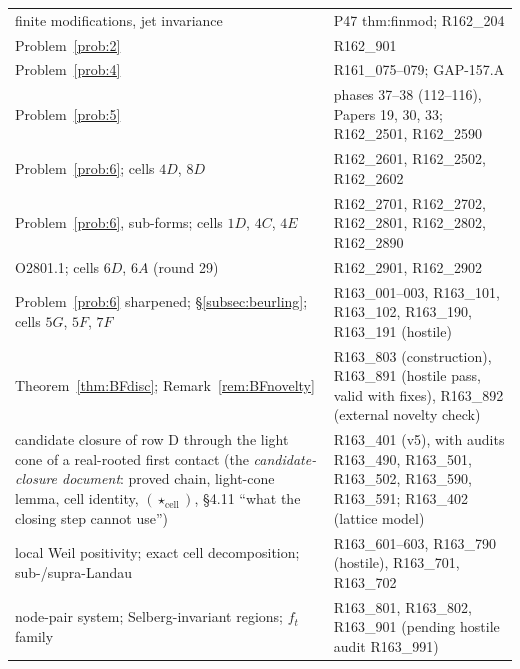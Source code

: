 \documentclass[11pt]{amsart}
\theoremstyle{definition}
\theoremstyle{remark}
\begin{document}
\begin{center}
\begin{tabularx}{\textwidth}{@{}p{5.2cm}Y@{}}
finite modifications, jet invariance & P47 thm:finmod; R162\_204 \\
Problem~\ref{prob:2} & R162\_901 \\
Problem~\ref{prob:4} & R161\_075--079; GAP-157.A \\
Problem~\ref{prob:5} & phases 37--38 (112--116), Papers 19, 30, 33; R162\_2501, R162\_2590 \\
Problem~\ref{prob:6}; cells $4D$, $8D$ & R162\_2601, R162\_2502, R162\_2602 \\
Problem~\ref{prob:6}, sub-forms; cells $1D$, $4C$, $4E$ & R162\_2701, R162\_2702, R162\_2801, R162\_2802, R162\_2890 \\
O2801.1; cells $6D$, $6A$ (round 29) & R162\_2901, R162\_2902 \\
Problem~\ref{prob:6} sharpened; \S\ref{subsec:beurling}; cells $5G$, $5F$, $7F$ & R163\_001--003, R163\_101, R163\_102, R163\_190, R163\_191 (hostile) \\
Theorem~\ref{thm:BFdisc}; Remark~\ref{rem:BFnovelty} & R163\_803 (construction), R163\_891 (hostile pass, valid with fixes), R163\_892 (external novelty check) \\
candidate closure of row D through the light cone of a real-rooted first contact (the \emph{candidate-closure document}: proved chain, light-cone lemma, cell identity, $(\star_{\mathrm{cell}})$, \S4.11 ``what the closing step cannot use'') & R163\_401 (v5), with audits R163\_490, R163\_501, R163\_502, R163\_590, R163\_591; R163\_402 (lattice model) \\
local Weil positivity; exact cell decomposition; sub-/supra-Landau & R163\_601--603, R163\_790 (hostile), R163\_701, R163\_702 \\
node-pair system; Selberg-invariant regions; $f_t$ family & R163\_801, R163\_802, R163\_901 (pending hostile audit R163\_991) \\
\bottomrule
\end{tabularx}
\end{center}
\end{document}
